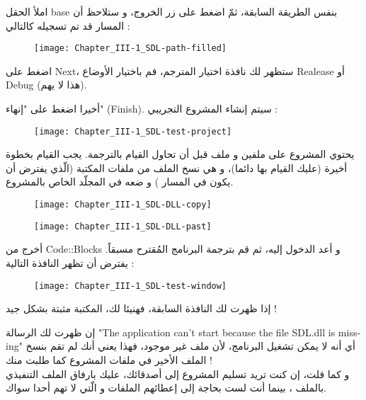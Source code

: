 املأ الحقل
\textenglish{base}
بنفس الطريقة السابقة، ثمّ اضغط على زر الخروج، و ستلاحظ أن المسار قد تم تسجيله كالتالي :

\begin{figure}[H]
	\centering
	\texttt{[image: Chapter\_III-1\_SDL-path-filled]}
\end{figure}

اضغط على
\textenglish{Next}،
 ستظهر لك نافذة اختيار المترجم، قم باختيار الأوضاع
\textenglish{Realease}
أو
\textenglish{Debug}
(هذا لا يهم).

أخيرا اضغط على "إنهاء"
(\textenglish{Finish}).
 سيتم إنشاء المشروع التجريبي :
 
 \begin{figure}[H]
 	\centering
 	\texttt{[image: Chapter\_III-1\_SDL-test-project]}
 \end{figure}


يحتوي المشروع على ملفين 
و ملف
قبل أن تحاول القيام بالترجمة. يجب القيام بخطوة أخيرة (عليك القيام بها دائما)، و هي نسخ الملف 
من ملفات المكتبة (الّذي يفترض أن يكون في المسار 
)
و ضعه في المجلّد الخاص بالمشروع.

 \begin{figure}[H]
	\centering
	\texttt{[image: Chapter\_III-1\_SDL-DLL-copy]}
\end{figure}
 \begin{figure}[H]
	\centering
	\texttt{[image: Chapter\_III-1\_SDL-DLL-past]}
\end{figure}

أخرج من 
\textenglish{Code::Blocks}
و أعد الدخول إليه، ثم قم بترجمة البرنامج المُقترح مسبقاً. يفترض أن تظهر النافذة التالية :

 \begin{figure}[H]
	\centering
	\texttt{[image: Chapter\_III-1\_SDL-test-window]}
\end{figure}


إذا ظهرت لك النافذة السابقة، فهنيئا لك، المكتبة مثبتة بشكل جيد !

\begin{information}
إن ظهرت لك الرسالة 
"\textenglish{The application can't start because the file SDL.dll is missing}"
أي أنه لا يمكن تشغيل البرنامج، لأن ملف 
غير موجود، فهذا يعني أنك لم تقم بنسخ الملف الأخير في ملفات المشروع كما طلبت منك !\\
و كما قلت، إن كنت تريد تسليم المشروع إلى أصدقائك، عليك بارفاق الملف التنفيذي 
بالملف 
،
بينما أنت لست بحاجة إلى إعطائهم الملفات 
و
الّتي لا تهم أحدا سواك.
\end{information}

